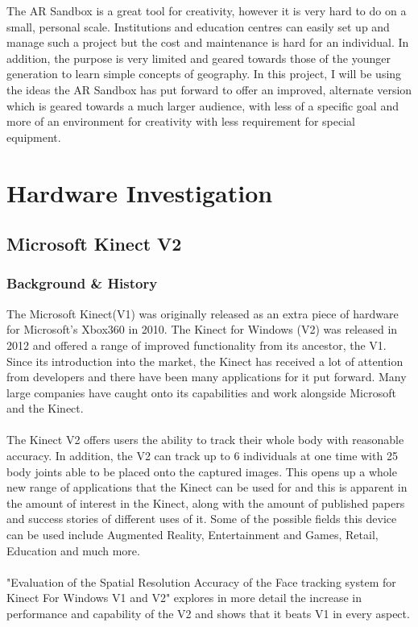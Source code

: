 \documentclass[11pt]{article}
\begin{document}
The AR Sandbox is a great tool for creativity, however it is very hard to do
on a small, personal scale. Institutions and education centres can easily set
up and manage such a project but the cost and maintenance is hard for an
individual. In addition, the purpose is very limited and geared towards those
of the younger generation to learn simple concepts of geography. In this project,
I will be using the ideas the AR Sandbox has put forward to offer an
improved, alternate version which is geared towards a much larger audience, with
less of a specific goal and more of an environment for creativity with less
requirement for special equipment.

\section{Hardware Investigation}
\subsection{Microsoft Kinect V2}
\subsubsection{Background \& History}
The Microsoft Kinect(V1) was originally released as an extra piece of hardware
for Microsoft's Xbox360 in 2010. The Kinect for Windows (V2) was released
in 2012 and offered a range of improved functionality from its ancestor, the
V1. Since its introduction into the market, the Kinect has received a lot of
attention from developers and there have been many applications for it put
forward. Many large companies have caught onto its capabilities and work 
alongside Microsoft and the Kinect.\\ 
\\
The Kinect V2 offers users the ability to track their
whole body with reasonable accuracy. In addition, the V2 can track up to 6 individuals
at one time with 25 body joints able to be placed onto the captured images.
This opens up a whole new range of applications
that the Kinect can be used for and this is apparent in the amount of interest in the
Kinect, along with the amount of published papers and success stories of different
uses of it. Some of the possible fields this device can be used include 
Augmented Reality, Entertainment and Games, Retail, Education and much more.\\
\\ 
"Evaluation of the Spatial Resolution Accuracy of the Face 
tracking system for Kinect For Windows V1 and V2" \cite{AmonFuhrmann14}
explores in more detail the increase in performance and capability
of the V2 and shows that it beats V1 in every aspect. 
\end{document}
